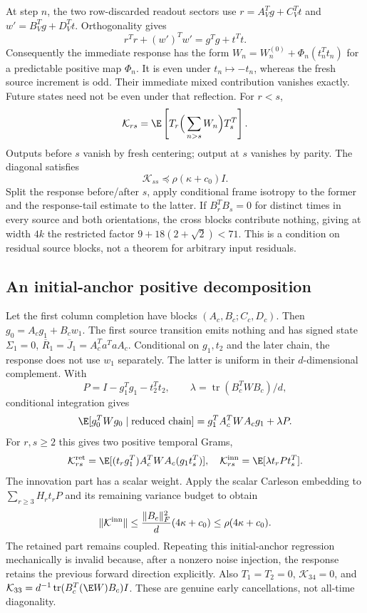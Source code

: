 \documentclass[11pt,oneside,openany,a4paper]{book}
\numberwithin{equation}{chapter}
\theoremstyle{definition}
\theoremstyle{remark}
\DeclareMathOperator{\tr}{tr}\DeclareMathOperator{\rank}{rank}
\begin{document}
At step $n$, the two row-discarded readout sectors use $r=A_V^Tg+C_V^Tt$ and $w'=B_V^Tg+D_V^Tt$. Orthogonality gives
\[
 r^Tr+(w')^Tw'=g^Tg+t^Tt.
\]
Consequently the immediate response has the form $W_n=W_n^{(0)}+\Phi_n(t_n^Tt_n)$ for a predictable positive map $\Phi_n$. It is even under $t_n\mapsto-t_n$, whereas the fresh source increment is odd. Their immediate mixed contribution vanishes exactly. Future states need not be even under that reflection. For $r<s$,
\begin{equation}\label{base:new:delayed-only}
 \mathcal K_{rs}=\E\left[T_r\Big(\sum_{n>s}W_n\Big)T_s^T\right].
\end{equation}
Outputs before $s$ vanish by fresh centering; output at $s$ vanishes by parity. The diagonal satisfies
\[
 \mathcal K_{ss}\preceq\rho(\kappa+c_0)I.
\]
Split the response before/after $s$, apply conditional frame isotropy to the former and the response-tail estimate to the latter. If $B_r^TB_s=0$ for distinct times in every source and both orientations, the cross blocks contribute nothing, giving at width $4k$ the restricted factor
$9+18(2+\sqrt2)<71$. This is a condition on residual source blocks, not a theorem for arbitrary input residuals.

\subsection{An initial-anchor positive decomposition}
Let the first column completion have blocks $(A_c,B_c;C_c,D_c)$. Then $g_0=A_cg_1+B_cw_1$. The first source transition emits nothing and has signed state $\Sigma_1=0$, $\overline R_1=\overline J_1=A_c^Ta^TaA_c$. Conditional on $g_1,t_2$ and the later chain, the response does not use $w_1$ separately. The latter is uniform in their $d$-dimensional complement. With
\[
 P=I-g_1^Tg_1-t_2^Tt_2,\qquad
 \lambda=\tr(B_c^TWB_c)/d,
\]
conditional integration gives
\[
 \E[g_0^TWg_0\mid\text{reduced chain}]
 =g_1^TA_c^TWA_cg_1+\lambda P.
\]
For $r,s\ge2$ this gives two positive temporal Grams,
\[
 \mathcal K^{\rm ret}_{rs}=\E[(t_rg_1^T)A_c^TWA_c(g_1t_s^T)],
 \quad\mathcal K^{\rm inn}_{rs}=\E[\lambda t_rPt_s^T].
\]
The innovation part has a scalar weight. Apply the scalar Carleson embedding to $\sum_{r\ge3}H_rt_rP$ and its remaining variance budget to obtain
\begin{equation}\label{base:new:innovation-bound}
 \|\mathcal K^{\rm inn}\|\le\frac{\|B_c\|_F^2}{d}(4\kappa+c_0)
 \le\rho(4\kappa+c_0).
\end{equation}
The retained part remains coupled. Repeating this initial-anchor regression mechanically is invalid because, after a nonzero noise injection, the response retains the previous forward direction explicitly. Also $T_1=T_2=0$, $\mathcal K_{34}=0$, and
$\mathcal K_{33}=d^{-1}\tr(B_c^T(\E W)B_c)I$. These are genuine early cancellations, not all-time diagonality.
\end{document}
